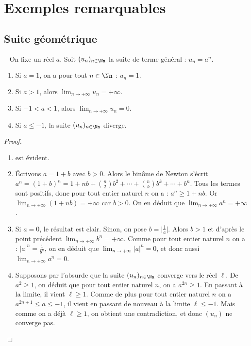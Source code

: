 \documentclass[class=report,crop=false]{standalone}
\begin{document}
\section{Exemples remarquables}

\subsection{Suite géométrique}

\begin{proposition}
~
\label{prop:suitegeo}
On fixe un réel $a$. Soit $(u_n)_{n\in \Nn}$ la suite de terme général : $u_n=a^n$.
\begin{enumerate}
  \item Si $a=1$, on a pour tout $n\in \Nn$ : $u_n=1$.
  \item Si $a>1$, alors $\lim_{n\to +\infty} u_n= +\infty$.
  \item Si $-1<a<1$, alors $\lim_{n\to +\infty} u_n= 0$.
  \item Si $a\le-1$, la suite $(u_n)_{n\in \Nn}$ diverge.
\end{enumerate}
\end{proposition}

\begin{proof}~
  \begin{enumerate}
    \item est évident.
    \item Écrivons $a=1+b$ avec $b>0$. Alors le binôme de Newton s'écrit
$a^n=(1+b)^n=1+nb+\binom{n}{2}b^2+\cdots+\binom{n}{k}b^k+\cdots+b^n$. Tous les termes
sont positifs, donc pour tout entier naturel $n$ on a : $a^n\geq 1+nb$. Or
$\lim_{n\to +\infty}(1+nb)=+\infty$ car $b>0$. On en déduit que $\lim_{n\to +\infty} a^n=+\infty$.
    \item Si $a=0$, le résultat est clair. Sinon, on pose $b=\lvert \frac{1}{a}
\rvert$. Alors $b>1$ et d'après le point précédent $\lim_{n\to +\infty} b^n=+\infty$.
Comme pour tout entier naturel $n$ on a : $\lvert a \rvert ^n=\frac{1}{b^n}$, on en
déduit que $\lim_{n\to +\infty} \lvert a \rvert ^n=0$, et donc aussi $\lim_{n\to +\infty} a  ^n=0$.
    \item Supposons par l'absurde que la suite $(u_n)_{n\in \Nn}$
converge vers le réel $\ell$. De $a^2\geq 1$, on déduit que pour tout entier naturel $n$,
on a $a^{2n}\geq 1$. En passant à la limite, il vient $\ell\geq 1$. Comme de plus pour tout
entier naturel $n$ on a $a^{2n+1}\leq a \leq -1$, il vient en passant de nouveau à la
limite $\ell\leq -1$. Mais comme on a déjà $\ell\geq 1$, on obtient une contradiction, et donc $(u_n)$ ne converge pas.
  \end{enumerate}
\end{proof}
\end{document}
